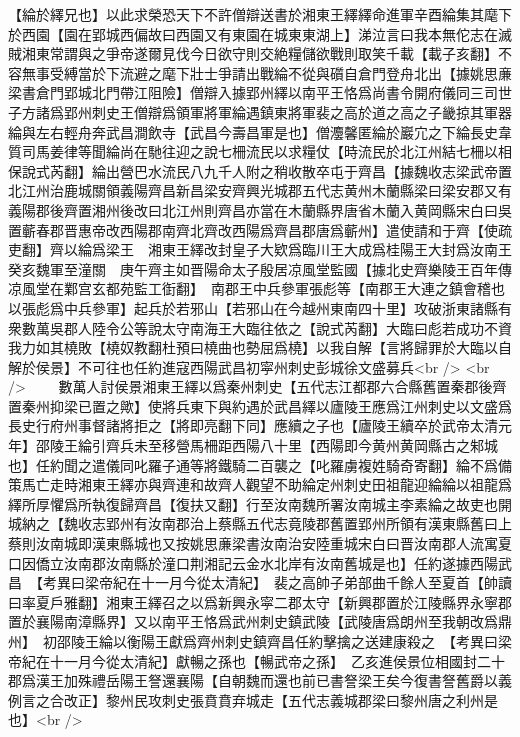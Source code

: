 【綸於繹兄也】以此求榮恐天下不許僧辯送書於湘東王繹繹命進軍辛酉綸集其麾下於西園【園在郢城西偏故曰西園又有東園在城東東湖上】涕泣言曰我本無佗志在滅賊湘東常謂與之爭帝遂爾見伐今日欲守則交絶糧儲欲戰則取笑千載【載子亥翻】不容無事受縛當於下流避之麾下壯士爭請出戰綸不從與礩自倉門登舟北出【據姚思亷梁書倉門郢城北門帶江阻險】僧辯入據郢州繹以南平王恪爲尚書令開府儀同三司世子方諸爲郢州刺史王僧辯爲領軍將軍綸遇鎮東將軍裴之高於道之高之子畿掠其軍器綸與左右輕舟奔武昌澗飲寺【武昌今壽昌軍是也】僧灋馨匿綸於巖宂之下綸長史韋質司馬姜律等聞綸尚在馳往迎之說七柵流民以求糧仗【時流民於北江州結七柵以相保說式芮翻】綸出營巴水流民八九千人附之稍收散卒屯于齊昌【據魏收志梁武帝置北江州治鹿城關領義陽齊昌新昌梁安齊興光城郡五代志黄州木蘭縣梁曰梁安郡又有義陽郡後齊置湘州後改曰北江州則齊昌亦當在木蘭縣界唐省木蘭入黄岡縣宋白曰吳置蘄春郡晋惠帝改西陽郡南齊北齊改西陽爲齊昌郡唐爲蘄州】遣使請和于齊【使疏吏翻】齊以綸爲梁王　湘東王繹改封皇子大欵爲臨川王大成爲桂陽王大封爲汝南王　癸亥魏軍至潼關　庚午齊主如晋陽命太子殷居凉風堂監國【據北史齊樂陵王百年傳凉風堂在鄴宫玄都苑監工衘翻】　南郡王中兵參軍張彪等【南郡王大連之鎮會稽也以張彪爲中兵參軍】起兵於若邪山【若邪山在今越州東南四十里】攻破浙東諸縣有衆數萬吳郡人陸令公等說太守南海王大臨往依之【說式芮翻】大臨曰彪若成功不資我力如其橈敗【橈奴教翻杜預曰橈曲也勢屈爲橈】以我自解【言將歸罪於大臨以自解於侯景】不可往也任約進寇西陽武昌初寜州刺史彭城徐文盛募兵<br />
<br />
　　數萬人討侯景湘東王繹以爲秦州刺史【五代志江都郡六合縣舊置秦郡後齊置秦州抑梁已置之歟】使將兵東下與約遇於武昌繹以廬陵王應爲江州刺史以文盛爲長史行府州事督諸將拒之【將即亮翻下同】應續之子也【廬陵王續卒於武帝太清元年】邵陵王綸引齊兵未至移營馬柵距西陽八十里【西陽即今黄州黄岡縣古之邾城也】任約聞之遣儀同叱羅子通等將鐵騎二百襲之【叱羅虜複姓騎奇寄翻】綸不爲備策馬亡走時湘東王繹亦與齊連和故齊人觀望不助綸定州刺史田祖龍迎綸綸以祖龍爲繹所厚懼爲所執復歸齊昌【復扶又翻】行至汝南魏所署汝南城主李素綸之故吏也開城納之【魏收志郢州有汝南郡治上蔡縣五代志竟陵郡舊置郢州所領有漢東縣舊曰上蔡則汝南城即漢東縣城也又按姚思亷梁書汝南治安陸重城宋白曰晋汝南郡人流寓夏口因僑立汝南郡汝南縣於潼口荆湘記云金水北岸有汝南舊城是也】任約遂據西陽武昌　【考異曰梁帝紀在十一月今從太清紀】　裴之高帥子弟部曲千餘人至夏首【帥讀曰率夏戶雅翻】湘東王繹召之以爲新興永寜二郡太守【新興郡置於江陵縣界永寧郡置於襄陽南漳縣界】又以南平王恪爲武州刺史鎮武陵【武陵唐爲朗州至我朝改爲鼎州】　初邵陵王綸以衡陽王獻爲齊州刺史鎮齊昌任約擊擒之送建康殺之　【考異曰梁帝紀在十一月今從太清紀】獻暢之孫也【暢武帝之孫】　乙亥進侯景位相國封二十郡爲漢王加殊禮岳陽王詧還襄陽【自朝魏而還也前已書詧梁王矣今復書詧舊爵以義例言之合改正】黎州民攻刺史張賁賁弃城走【五代志義城郡梁曰黎州唐之利州是也】<br />
